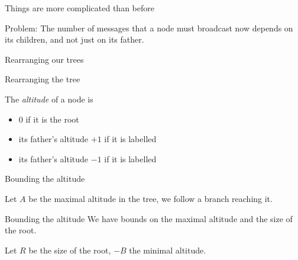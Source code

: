 \documentclass{beamer}
\begin{document}
\begin{frame}{Things are more complicated than before}
	\begin{center}
	
	\end{center}

	Problem: The number of messages that a node must broadcast now depends on its  children, and not just on its father.
\end{frame}

\begin{frame}{Rearranging our trees}
	\centering
	
\end{frame}

\begin{frame}{Rearranging the tree}
	\begin{definition}
		The \emph{altitude} of a node is 
		
		\begin{itemize}
			\item 0 if it is the root
			
			\item its father's altitude $+1$ if it is labelled 
		
			\item its father's altitude $-1$ if it is labelled 
		\end{itemize}
	\end{definition}
\end{frame}

\begin{frame}{Bounding the altitude}
	
	Let $A$ be the maximal altitude in the tree, we follow a branch reaching it. 
	
	
	
\end{frame}

\begin{frame}{Bounding the altitude}
	We have bounds on the maximal altitude and the size of the root.
	
	Let $R$ be the size of the root, $-B$ the minimal altitude.
	
	
\end{frame}

	
			
\end{document}
